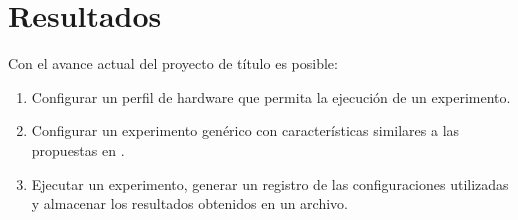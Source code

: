 \documentclass[\main/main.tex]{subfiles}
\begin{document}
\chapter{Resultados}
\label{cha:04_resultados}
	Con el avance actual del proyecto de título es posible:
	\begin{enumerate}\setlength\itemsep{-0.2em}
		\item Configurar un perfil de hardware que permita la ejecución de un experimento. 

		\item Configurar un experimento genérico con características similares a las propuestas en \cite{sub:02_experimentos_de_estimulacion}. 

		\item Ejecutar un experimento, generar un registro de las configuraciones utilizadas y almacenar los resultados obtenidos en un archivo.  

	\end{enumerate}
\end{document}
